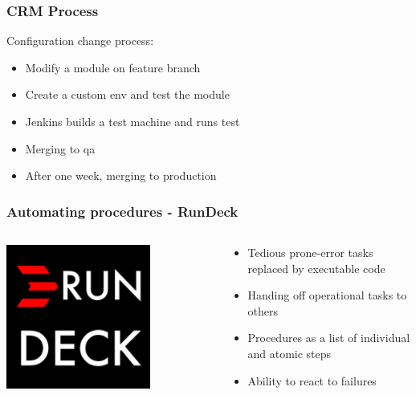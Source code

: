 \documentclass[aspectratio=169]{beamer}
\begin{document}

\begin{frame}
    \frametitle{CRM Process}
    Configuration change process:
    \begin{itemize}
        \item Modify a module on feature branch
        \item Create a custom env and test the module
        \item Jenkins builds a test machine and runs test
        \item Merging to qa
        \item After one week, merging to production
    \end{itemize}
\end{frame}


\begin{frame}
    \frametitle{Automating procedures - RunDeck}
    \begin{minipage}[T]{0.95\textwidth}
        \begin{columns}
            \begin{column}{0.5\textwidth}
                \begin{center}
                    \includegraphics[width=0.7\textwidth]{Rundeck.png}
                \end{center}
            \end{column}
            \begin{column}{0.5\textwidth}
                \begin{itemize}
                    \item Tedious prone-error tasks replaced by executable code
                    \item Handing off operational tasks to others
                    \item Procedures as a list of individual and atomic steps 
                    \item Ability to react to failures
                \end{itemize}
            \end{column}
        \end{columns}
    \end{minipage}
\end{frame}
\end{document}
